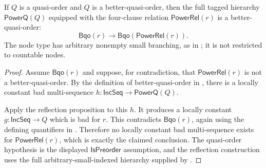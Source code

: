 \begin{corollary}
If $Q$ is a quasi-order and $Q$ is a better-quasi-order, then the full
tagged hierarchy $\mathsf{PowerQ}(Q)$ equipped with the four-clause relation
$\mathsf{PowerRel}(r)$ is a better-quasi-order:
\[
\mathsf{Bqo}(r)\longrightarrow
\mathsf{Bqo}(\mathsf{PowerRel}(r)).
\]
The node type has arbitrary nonempty small branching, as in
; it is not restricted to countable nodes.
\end{corollary}
\begin{proof}
Assume $\mathsf{Bqo}(r)$ and suppose, for contradiction, that
$\mathsf{PowerRel}(r)$ is not a better-quasi-order.  By the definition of
better-quasi-order in , there is a locally constant bad
multi-sequence
$h:\mathsf{IncSeq}\to\mathsf{PowerQ}(Q)$.

Apply the reflection proposition  to this $h$.
It produces a locally constant $g:\mathsf{IncSeq}\to Q$ which is bad for
$r$.  This contradicts $\mathsf{Bqo}(r)$, again using the defining
quantifiers in .  Therefore no locally constant bad
multi-sequence exists for $\mathsf{PowerRel}(r)$, which is exactly the
claimed conclusion.  The quasi-order hypothesis is the displayed
$\mathsf{IsPreorder}$ assumption, and the reflection construction uses the
full arbitrary-small-indexed hierarchy supplied by .
\end{proof}
